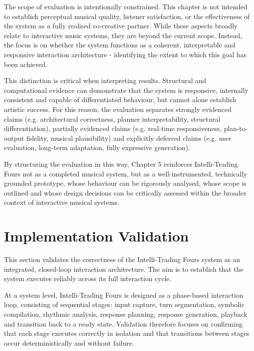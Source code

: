 The scope of evaluation is intentionally constrained. This chapter is
not intended to establish perceptual musical quality, listener
satisfaction, or the effectiveness of the system as a fully realised
co-creative partner. While these aspects broadly relate to interactive
music systems, they are beyond the current scope. Instead, the focus is
on whether the system functions as a coherent, interpretable and
responsive interaction architecture - identifying the extent to which
this goal has been achieved.

This distinction is critical when interpreting results. Structural and
computational evidence can demonstrate that the system is responsive,
internally consistent and capable of differentiated behaviour, but
cannot alone establish artistic success. For this reason, the evaluation
separates strongly evidenced claims (e.g. architectural correctness,
planner interpretability, structural differentiation), partially
evidenced claims (e.g. real-time responsiveness, plan-to-output
fidelity, musical plausibility) and explicitly deferred claims (e.g.
user evaluation, long-term adaptation, fully expressive generation).

By structuring the evaluation in this way, Chapter 5 reinforces
Intelli-Trading Fours not as a completed musical system, but as a
well-instrumented, technically grounded prototype, whose behaviour can
be rigorously analysed, whose scope is outlined and whose design
decisions can be critically assessed within the broader context of
interactive musical systems.

\section{Implementation Validation}\label{implementation-validation}

This section validates the correctness of the Intelli-Trading Fours
system as an integrated, closed-loop interaction architecture. The aim
is to establish that the system executes reliably across its full
interaction cycle.

At a system level, Intelli-Trading Fours is designed as a phase-based
interaction loop, consisting of sequential stages: input capture, turn
segmentation, symbolic compilation, rhythmic analysis, response
planning, response generation, playback and transition back to a ready
state. Validation therefore focuses on confirming that each stage
executes correctly in isolation and that transitions between stages
occur deterministically and without failure.

